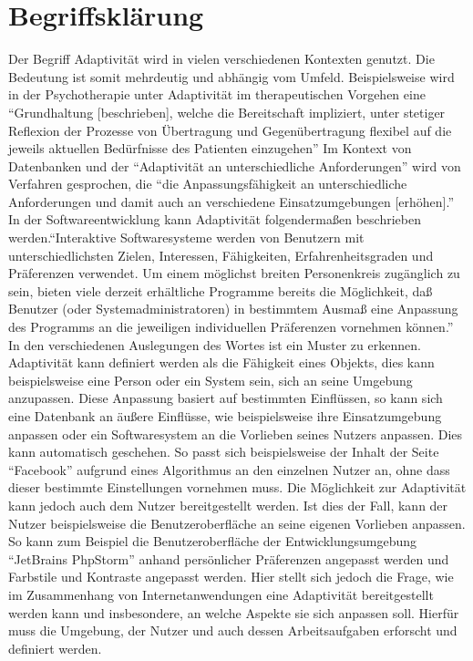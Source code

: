 \documentclass[12pt, paper=a4, bibtotoc, toc=listof, headsepline=true]{scrreprt}
\begin{document}
	\section{Begriffsklärung}
	Der Begriff Adaptivität wird in vielen verschiedenen Kontexten genutzt. Die Bedeutung ist somit mehrdeutig und abhängig vom Umfeld. Beispielsweise wird in der Psychotherapie unter Adaptivität im therapeutischen Vorgehen eine \enquote{Grundhaltung [beschrieben], welche die Bereitschaft impliziert, unter stetiger Reflexion der Prozesse von Übertragung und Gegenübertragung flexibel auf die jeweils aktuellen Bedürfnisse des Patienten einzugehen}\cite[S. 45]{woeller2014tiefenpsychologisch} Im Kontext von Datenbanken und der \enquote{Adaptivität an unterschiedliche Anforderungen} wird von Verfahren gesprochen, die \enquote{die Anpassungsfähigkeit an unterschiedliche Anforderungen und damit auch an verschiedene Einsatzumgebungen [erhöhen].}\cite[][S. 112]{loeser2013web}
	In der Softwareentwicklung kann Adaptivität folgendermaßen beschrieben werden.\enquote{Interaktive Softwaresysteme werden von Benutzern mit unterschiedlichsten Zielen, Interessen, Fähigkeiten, Erfahrenheitsgraden und Präferenzen verwendet. Um einem möglichst breiten Personenkreis zugänglich zu sein, bieten viele derzeit erhältliche Programme bereits die Möglichkeit, daß Benutzer (oder Systemadministratoren) in bestimmtem Ausmaß eine Anpassung des Programms an die jeweiligen individuellen Präferenzen vornehmen können.}\cite[S. 1]{Kobsa1993}
	\newline In den verschiedenen Auslegungen des Wortes ist ein Muster zu erkennen. Adaptivität kann definiert werden als die Fähigkeit eines Objekts, dies kann beispielsweise eine Person oder ein System sein, sich an seine Umgebung anzupassen. Diese Anpassung basiert auf bestimmten Einflüssen, so kann sich eine Datenbank an äußere Einflüsse, wie beispielsweise ihre Einsatzumgebung anpassen oder ein Softwaresystem an die Vorlieben seines Nutzers anpassen. Dies kann automatisch geschehen. So passt sich beispielsweise der Inhalt der Seite \enquote{Facebook} aufgrund eines Algorithmus an den einzelnen Nutzer an, ohne dass dieser bestimmte Einstellungen vornehmen muss.\cite[vgl.]{Rixecker2016} Die Möglichkeit zur Adaptivität kann jedoch auch dem Nutzer bereitgestellt werden. Ist dies der Fall, kann der Nutzer beispielsweise die Benutzeroberfläche an seine eigenen Vorlieben anpassen. So kann zum Beispiel die Benutzeroberfläche der Entwicklungsumgebung \enquote{JetBrains PhpStorm} anhand persönlicher Präferenzen angepasst werden und Farbstile und Kontraste angepasst werden.
	\newline
	Hier stellt sich jedoch die Frage, wie im Zusammenhang von Internetanwendungen eine Adaptivität bereitgestellt werden kann und insbesondere, an welche Aspekte sie sich anpassen soll. Hierfür muss die Umgebung, der Nutzer und auch dessen Arbeitsaufgaben erforscht und definiert werden.
\end{document}
